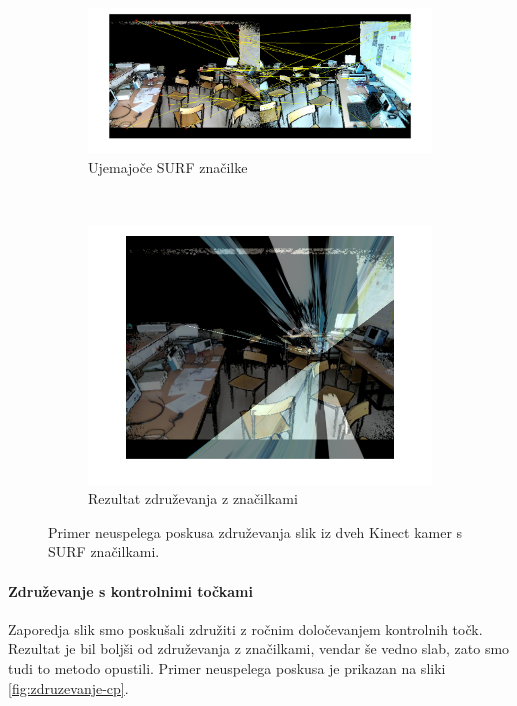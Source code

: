 \begin{figure}[!htb]
	\centering
	\begin{subfigure}[t]{0.45\columnwidth}
		\includegraphics[width=\columnwidth]{./Slike/matched-features.png}
		\caption{Ujemajoče SURF značilke}
		\label{fig:zdruzevanje-surf}
	\end{subfigure}
	~
	\begin{subfigure}[t]{0.45\columnwidth}
		\includegraphics[width=\columnwidth]{./Slike/features-calibration-result.png}
		\caption{Rezultat združevanja z značilkami}
		\label{fig:zdruzevanje-result}
	\end{subfigure}
	\caption{Primer neuspelega poskusa združevanja slik iz dveh Kinect kamer s SURF značilkami.}
	\label{fig:zdruzevanje-znacilke}
\end{figure}

\paragraph{Združevanje s kontrolnimi točkami}
Zaporedja slik smo poskušali združiti z ročnim določevanjem kontrolnih točk. Rezultat je bil boljši od združevanja z značilkami, vendar še vedno slab, zato smo tudi to metodo opustili. Primer neuspelega poskusa je prikazan na sliki \ref{fig:zdruzevanje-cp}.

